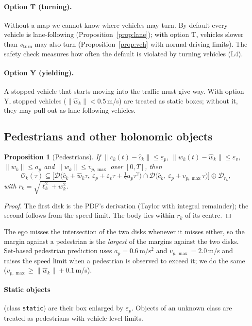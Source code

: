 \documentclass[11pt]{article}
\newtheorem{proposition}{Proposition}
\theoremstyle{definition}
\theoremstyle{remark}
\newcommand{\Disk}{\mathcal{D}}
\newcommand{\Occ}{\mathcal{O}}
\begin{document}
\paragraph{Option T (turning).} Without a map we cannot know where vehicles may turn. By default every
vehicle is lane-following (Proposition~\ref{prop:lane}); with option T, vehicles slower than $v_{\mathrm{turn}}$
may also turn (Proposition~\ref{prop:veh} with normal-driving limits). The safety check measures how often
the default is violated by turning vehicles (L4).

\paragraph{Option Y (yielding).} A stopped vehicle that starts moving into the traffic must give way. With
option Y, stopped vehicles ($\|\hat w_k\|<0.5$\,m/s) are treated as static boxes; without it, they may pull
out as lane-following vehicles.

\subsection{Pedestrians and other holonomic objects}
\begin{proposition}[Pedestrians]\label{prop:ped}
If $\|c_k(t)-\hat c_k\|\le\varepsilon_p$, $\|w_k(t)-\hat w_k\|\le\varepsilon_v$, $\|\dot w_k\|\le a_p$ and
$\|w_k\|\le v_{p,\max}$ over $[0,T]$, then
\[
\Occ_k(\tau)\subseteq\Big[\Disk\big(\hat c_k+\hat w_k\tau,\ \varepsilon_p+\varepsilon_v\tau+\tfrac12a_p\tau^2\big)\cap\Disk\big(\hat c_k,\ \varepsilon_p+v_{p,\max}\tau\big)\Big]\oplus\Disk_{r_k},
\]
with $r_k=\sqrt{\ell_k^2+w_k^2}$.
\end{proposition}
\begin{proof}
The first disk is the PDF's derivation (Taylor with integral remainder); the second follows from the
speed limit. The body lies within $r_k$ of its centre.
\end{proof}
The ego misses the intersection of the two disks whenever it misses either, so the margin against a
pedestrian is the \emph{largest} of the margins against the two disks. Set-based pedestrian prediction
\cite{koschi2018} uses $a_p=0.6$\,m/s$^2$ and $v_{p,\max}=2.0$\,m/s and raises the speed limit when a
pedestrian is observed to exceed it; we do the same ($v_{p,\max}\ge\|\hat w_k\|+0.1$\,m/s).

\paragraph{Static objects} (class \texttt{static}) are their box enlarged by $\varepsilon_p$. Objects of an
unknown class are treated as pedestrians with vehicle-level limits.
\end{document}
